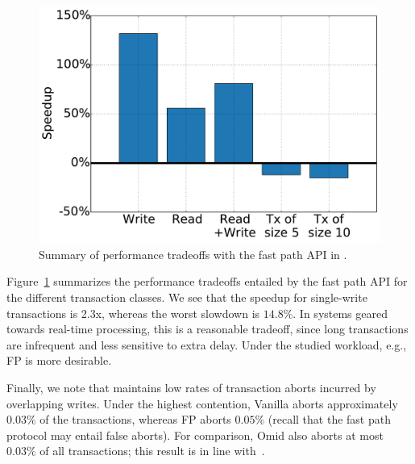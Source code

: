 \begin{figure}[h!]
\centering
\includegraphics[width=.45\textwidth]{figs/speedup.pdf}
\caption{Summary of performance tradeoffs with the fast path API in {\sys}.}
\label{fig:fp-tradeoff}
\end{figure}

Figure~\ref{fig:fp-tradeoff} summarizes the performance tradeoffs entailed by the fast path API
for the different transaction classes. 
We see that the speedup for single-write transactions is 2.3x, whereas the worst slowdown is $14.8\%$. 
In systems geared towards real-time processing, this is a reasonable tradeoff, since long transactions 
are infrequent and less sensitive to extra delay. Under the studied workload, e.g.,   FP \sys\/ is more desirable. 

Finally, we note that \sys\/ maintains low rates of transaction aborts incurred by overlapping writes. Under the 
highest contention,  Vanilla \sys\/ aborts approximately $0.03\%$ of the transactions, whereas 
FP \sys\/ aborts $0.05\%$ (recall that the fast path protocol may entail false aborts). For comparison, 
Omid also aborts at most $0.03\%$ of all transactions; this result is in line with~\cite{Omid2017}.  


